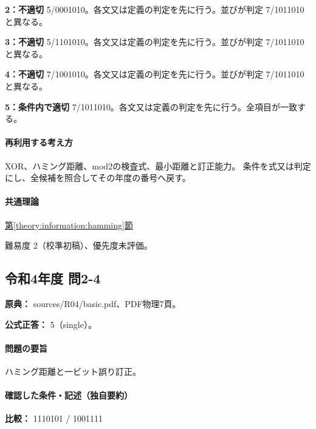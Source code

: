 \noindent\textbf{2：不適切} 5/0001010。各文又は定義の判定を先に行う。並びが判定 7/1011010 と異なる。\par

\noindent\textbf{3：不適切} 5/1101010。各文又は定義の判定を先に行う。並びが判定 7/1011010 と異なる。\par

\noindent\textbf{4：不適切} 7/1001010。各文又は定義の判定を先に行う。並びが判定 7/1011010 と異なる。\par

\noindent\textbf{5：条件内で適切} 7/1011010。各文又は定義の判定を先に行う。全項目が一致する。\par

\paragraph{再利用する考え方} XOR、ハミング距離、mod2の検査式、最小距離と訂正能力。 条件を式又は判定にし、全候補を照合してその年度の番号へ戻す。

\paragraph{共通理論} \hyperref[theory:information:hamming]{第\ref*{theory:information:hamming}節}

\par 難易度 2（校準初稿）、優先度未評価。

\subsection{令和4年度 問2-4}
\label{q:r04-reg-basic-2-4}

\noindent\textbf{原典：} sources/R04/basic.pdf、PDF物理7頁。

\textbf{公式正答：} 5（single）。

\paragraph{問題の要旨} ハミング距離と一ビット誤り訂正。

\paragraph{確認した条件・記述（独自要約）}\mbox{}\par

\noindent\textbf{比較：} 1110101 / 1001111\par

